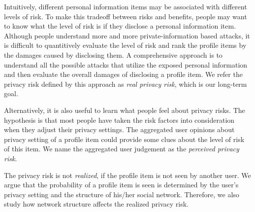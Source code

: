 \documentclass[a4paper]{article}
\begin{document}

Intuitively, different personal information items may be associated
with different levels of risk. To make this tradeoff between risks and
benefits, people may want to know what the level of risk is if they
disclose a personal information item. Although people understand more
and more private-information based attacks, it is difficult to
quantitively evaluate the level of risk and rank the profile items by
the damages caused by disclosing them. A comprehensive approach is to
understand all the possible attacks that utilize the exposed personal
information and then evaluate the overall damages of disclosing a
profile item. We refer the privacy risk defined by this approach as
\emph{real privacy risk}, which is our long-term goal.

Alternatively, it is also useful to learn what people feel about
privacy risks. The hypothesis is that most people have taken the risk
factors into consideration when they adjust their privacy
settings. The aggregated user opinions about privacy setting of a
profile item could provide some clues about the level of risk of this
item. We name the aggregated user judgement as the \emph{perceived
  privacy risk}.

The privacy risk is not \emph{realized}, if the profile item is not
seen by another user. We argue that the probability of a profile item
is seen is determined by the user's privacy setting and the structure
of his/her social network. Therefore, we also study how network
structure affects the realized privacy risk.
\end{document}
